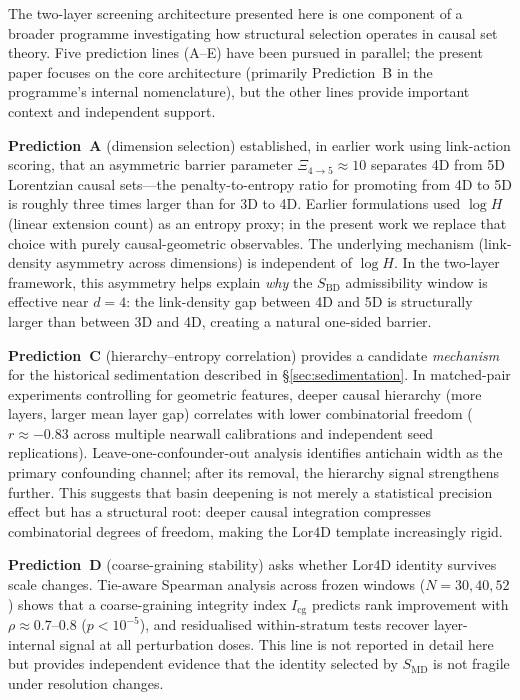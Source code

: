 \documentclass[12pt,a4paper]{article}
\newcommand{\SBD}{S_{\mathrm{BD}}}
\newcommand{\SMD}{S_{\mathrm{MD}}}
\newcommand{\Lor}{\mathrm{Lor4D}}
\begin{document}
The two-layer screening architecture presented here is one component of a broader
programme investigating how structural selection operates in causal set theory.
Five prediction lines (A--E) have been pursued in parallel; the present paper
focuses on the core architecture (primarily Prediction~B in the programme's
internal nomenclature), but the other lines provide important context and
independent support.

\textbf{Prediction~A} (dimension selection) established, in earlier work using
link-action scoring, that an asymmetric barrier parameter
$\Xi_{4\to 5}\approx 10$ separates 4D from 5D Lorentzian causal sets---the
penalty-to-entropy ratio for promoting from 4D to 5D is roughly three times
larger than for 3D to 4D.
Earlier formulations used $\log H$ (linear extension count) as an entropy proxy;
in the present work we replace that choice with purely causal-geometric
observables. The underlying mechanism (link-density asymmetry across
dimensions) is independent of $\log H$.
In the two-layer framework, this asymmetry helps explain \emph{why} the $\SBD$
admissibility window is effective near $d=4$: the link-density gap between 4D and
5D is structurally larger than between 3D and 4D, creating a natural one-sided
barrier.

\textbf{Prediction~C} (hierarchy--entropy correlation) provides a candidate
\emph{mechanism} for the historical sedimentation described in \S\ref{sec:sedimentation}.
In matched-pair experiments controlling for geometric features, deeper causal
hierarchy (more layers, larger mean layer gap) correlates with lower combinatorial
freedom ($r\approx -0.83$ across multiple nearwall calibrations and independent
seed replications).
Leave-one-confounder-out analysis identifies antichain width as the primary
confounding channel; after its removal, the hierarchy signal strengthens further.
This suggests that basin deepening is not merely a statistical precision effect
but has a structural root: deeper causal integration compresses combinatorial
degrees of freedom, making the $\Lor$ template increasingly rigid.

\textbf{Prediction~D} (coarse-graining stability) asks whether $\Lor$ identity
survives scale changes.
Tie-aware Spearman analysis across frozen windows ($N=30,40,52$) shows that a
coarse-graining integrity index $I_{\mathrm{cg}}$ predicts rank improvement with
$\rho\approx 0.7$--$0.8$ ($p<10^{-5}$), and residualised within-stratum tests
recover layer-internal signal at all perturbation doses.
This line is not reported in detail here but provides independent evidence that
the identity selected by $\SMD$ is not fragile under resolution changes.
\end{document}
